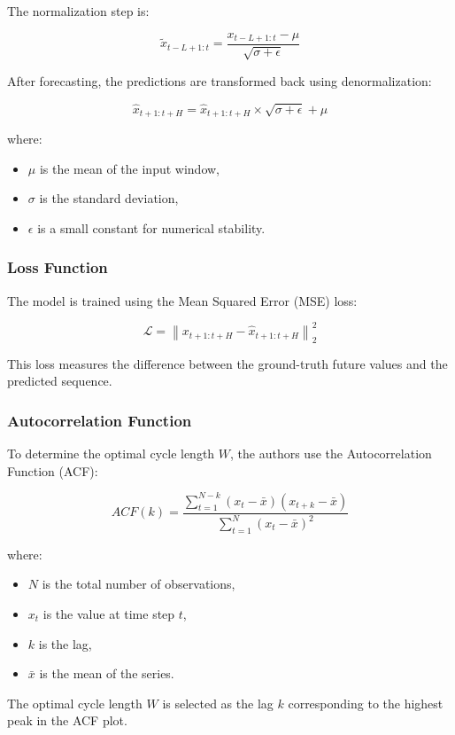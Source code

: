 \documentclass[10pt]{article}
\begin{document}
The normalization step is:

\[
\tilde{x}_{t-L+1:t}
=
\frac{x_{t-L+1:t}-\mu}
{\sqrt{\sigma+\epsilon}}
\]

After forecasting, the predictions are transformed back using denormalization:

\[
\hat{x}_{t+1:t+H}
=
\hat{x}_{t+1:t+H}
\times
\sqrt{\sigma+\epsilon}
+
\mu
\]

where:
\begin{itemize}
    \item $\mu$ is the mean of the input window,
    \item $\sigma$ is the standard deviation,
    \item $\epsilon$ is a small constant for numerical stability.
\end{itemize}

\subsubsection{Loss Function}

The model is trained using the Mean Squared Error (MSE) loss:

\[
\mathcal{L}
=
\left\|
x_{t+1:t+H}
-
\hat{x}_{t+1:t+H}
\right\|_2^2
\]

This loss measures the difference between the ground-truth future values and the predicted sequence.

\subsubsection{Autocorrelation Function}

To determine the optimal cycle length $W$, the authors use the Autocorrelation Function (ACF):

\[
ACF(k)
=
\frac{
\sum_{t=1}^{N-k}
(x_t-\bar{x})(x_{t+k}-\bar{x})
}{
\sum_{t=1}^{N}
(x_t-\bar{x})^2
}
\]

where:
\begin{itemize}
    \item $N$ is the total number of observations,
    \item $x_t$ is the value at time step $t$,
    \item $k$ is the lag,
    \item $\bar{x}$ is the mean of the series.
\end{itemize}

The optimal cycle length $W$ is selected as the lag $k$ corresponding to the highest peak in the ACF plot.
\end{document}
